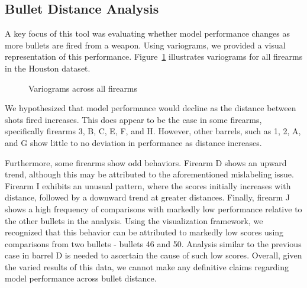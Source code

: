 \documentclass[
  12pt]{article}
\begin{document}
\subsection{Bullet Distance Analysis}\label{bullet-distance-analysis}

A key focus of this tool was evaluating whether model performance
changes as more bullets are fired from a weapon. Using variograms, we
provided a visual representation of this performance.
Figure~\ref{fig-variograms} illustrates variograms for all firearms in
the Houston dataset.

\begin{figure}


\caption{\label{fig-variograms}Variograms across all firearms}

\end{figure}%

We hypothesized that model performance would decline as the distance
between shots fired increases. This does appear to be the case in some
firearms, specifically firearms 3, B, C, E, F, and H. However, other
barrels, such as 1, 2, A, and G show little to no deviation in
performance as distance increases.

Furthermore, some firearms show odd behaviors. Firearm D shows an upward
trend, although this may be attributed to the aforementioned mislabeling
issue. Firearm I exhibits an unusual pattern, where the scores initially
increases with distance, followed by a downward trend at greater
distances. Finally, firearm J shows a high frequency of comparisons with
markedly low performance relative to the other bullets in the analysis.
Using the visualization framework, we recognized that this behavior can
be attributed to markedly low scores using comparisons from two bullets
- bullets 46 and 50. Analysis similar to the previous case in barrel D
is needed to ascertain the cause of such low scores. Overall, given the
varied results of this data, we cannot make any definitive claims
regarding model performance across bullet distance.
\end{document}

